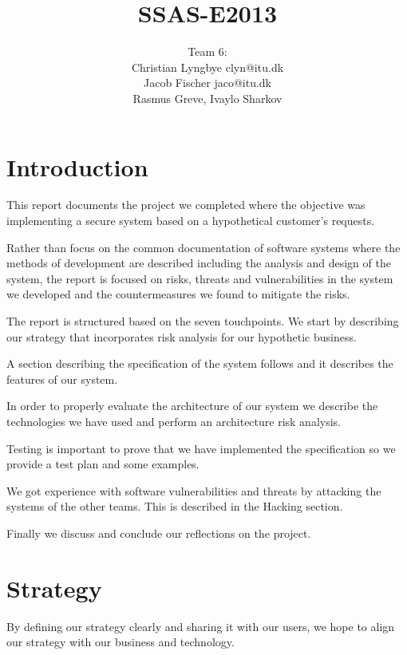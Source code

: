 \documentclass[a4paper]{article}
\title{SSAS-E2013}
\author{Team 6:\\Christian Lyngbye clyn@itu.dk\\Jacob Fischer jaco@itu.dk\\Rasmus Greve, Ivaylo Sharkov}
\begin{document}
\maketitle

\newpage
\tableofcontents

\newpage
\section{Introduction}
This report documents the project we completed where the objective was implementing a secure system based on a hypothetical customer's requests.

Rather than focus on the common documentation of software systems where the methods of development are described including the analysis and design of the system, the report is focused on risks, threats and vulnerabilities in the system we developed and the countermeasures we found to mitigate the risks.

The report is structured based on the seven touchpoints\cite{McGraw2006}. We start by describing our strategy that incorporates risk analysis for our hypothetic business.

A section describing the specification of the system follows and it describes the features of our system. 

In order to properly evaluate the architecture of our system we describe the technologies we have used and perform an architecture risk analysis.

Testing is important to prove that we have implemented the specification so we provide a test plan and some examples.

We got experience with software vulnerabilities and threats by attacking the systems of the other teams. This is described in the Hacking section.

Finally we discuss and conclude our reflections on the project.




\section{Strategy}
By defining our strategy clearly and sharing it with our users, we hope to align our strategy with our business and technology.
\end{document}
